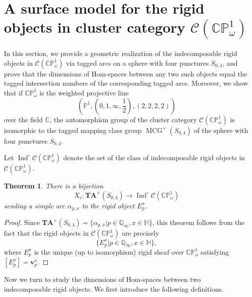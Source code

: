 \documentclass[11pt,a4paper,reqno]{amsart}%
\theoremstyle{plain}
\newtheorem{theorem}{Theorem}[section]
\theoremstyle{definition}
\numberwithin{equation}{section}
\numberwithin{equation}{section}
\def\CC{\mathbb{C}}
\newcommand{\QQi}{\mathbb{Q}_\infty}
\newcommand{\Ind}{\operatorname{Ind}\nolimits}
\def\wt{\omega}
\newcommand{\bv}{\mathbf{v}}
\newcommand{\MCG}{\operatorname{MCG}}
\def\Ind{\operatorname{Ind}}
\def\CPone{\mathbb{CP}^1_{\wt}}
\def\CCP{\mathcal{C}(\CPone)}
\def\TA{\mathbf{T}\mathbf{A}}
\newcommand{\bfH}{\mathbb{H}}
\begin{document}
\section{A surface model  for the rigid objects in cluster category $\CCP$}\label{sec:5}
 In this  section, we provide a geometric realization of the 
 indecomposable  rigid  objects in $\CCP$ via tagged arcs on a sphere with four punctures $S_{0,4}$, and prove that 
 the dimensions of Hom-spaces between any two such objects equal the tagged intersection numbers of the corresponding tagged arcs.
Moreover, we show that   if  $\CPone$ is the  weighted projective line $$(\mathbb{P}^1,(0,1,\infty,\frac{1}{2}),(2,2,2,2))$$
  over the  field  $\CC$,
 the automorphism group of the cluster category $\CCP$ is isomorphic to the tagged mapping class group $\MCG^\times(S_{0,4})$ of the sphere with four punctures $S_{0,4}$. 
  
Let 
  $ \Ind^\circ\CCP$  denote   the set of  the class of indecomposable rigid objects in $\CCP$. 

\begin{theorem}\label{thm:C}
There is a bijection
$$X_c\colon \TA^\times(S_{0,4}) \to \Ind^\circ\CCP$$
sending a  simple arc $\alpha_{p,x}$ to  the rigid object ${E}_p^x$.
\end{theorem}
\begin{proof}
Since $\TA^\times(S_{0,4})=\{\alpha_{p,x}|p\in\QQi,x \in\bfH\}$, 
this theorem follows from  the fact  that  the rigid objects in  $\CCP$  are precisely  
$$\{E_p^x |p\in\QQi, x\in \bfH\},$$
where $E_{p}^{x}$ is the unique (up to isomorphism) rigid sheaf over $\CPone$ satisfying $ [E^x_p]=\bv_p^x$.
\end{proof}

Now we turn to study the dimensions of Hom-spaces between
two indecomposable rigid objects. We first introduce the following definitions. 

 
\end{document}
